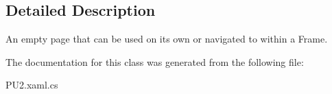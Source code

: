 \subsection{Detailed Description}
An empty page that can be used on its own or navigated to within a Frame. 



The documentation for this class was generated from the following file\+:\begin{DoxyCompactItemize}
\item 
P\+U2.\+xaml.\+cs\end{DoxyCompactItemize}
